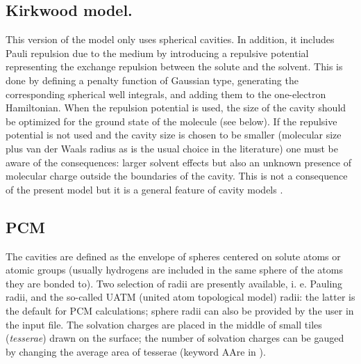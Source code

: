 \subsection{Kirkwood model.}


This version of the model only uses spherical cavities. In addition,
it includes Pauli repulsion due to the medium by introducing a repulsive
potential representing the exchange repulsion between the solute and the solvent.
This is done by defining a penalty function of Gaussian type, generating
the corresponding spherical well integrals, and adding them to the one-electron
Hamiltonian. When the repulsion potential is used, the size of the cavity should
be optimized for the ground state of the molecule (see below). If the repulsive
potential is not used and the cavity size is chosen to be smaller (molecular
size plus van der Waals radius as is the usual choice in the literature)
one must be aware of the consequences: larger solvent effects but also
an unknown presence of molecular charge outside the boundaries of the
cavity. This is not a consequence of the present model but it is a general
feature of cavity models \cite{Serrano:97b}. 


\subsection{PCM}


The cavities are defined as the envelope of spheres centered on solute
atoms or atomic groups (usually hydrogens are included in the same sphere
of the atoms they are bonded to). Two selection of radii are presently available,
i. e. Pauling radii, and the so-called UATM (united atom topological model) radii: 
the latter is the default for PCM calculations; sphere radii can also be provided
by the user in the input file.
The solvation charges are placed
in the middle of small tiles ({\em tesserae}) drawn on the surface; the number of 
solvation charges can be gauged by changing the average area of tesserae (keyword
AAre in ). 

